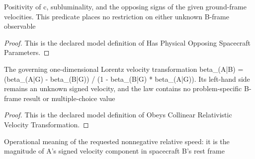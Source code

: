 \begin{definition}
  \label{def:physics:phyx-mini-0547:phyxminiproblems-problemphyxmini0547-hasphysicalopposingspacecraftparameters}
  Positivity of c, subluminality, and the opposing signs of the given ground-frame velocities. This predicate places no restriction on either unknown B-frame observable
\end{definition}
\begin{proof}
  This is the declared model definition of Has Physical Opposing Spacecraft Parameters.
\end{proof}
\begin{definition}
  \label{def:physics:phyx-mini-0547:phyxminiproblems-problemphyxmini0547-obeyscollinearrelativisticvelocitytransformation}
  The governing one-dimensional Lorentz velocity transformation beta\_(A|B) = (beta\_(A|G) - beta\_(B|G)) / (1 - beta\_(B|G) * beta\_(A|G)). Its left-hand side remains an unknown signed velocity, and the law contains no problem-specific B-frame result or multiple-choice value
\end{definition}
\begin{proof}
  This is the declared model definition of Obeys Collinear Relativistic Velocity Transformation.
\end{proof}
\begin{definition}
  \label{def:physics:phyx-mini-0547:phyxminiproblems-problemphyxmini0547-relativespeedismagnitudeofbframevelocity}
  Operational meaning of the requested nonnegative relative speed: it is the magnitude of A's signed velocity component in spacecraft B's rest frame
\end{definition}
